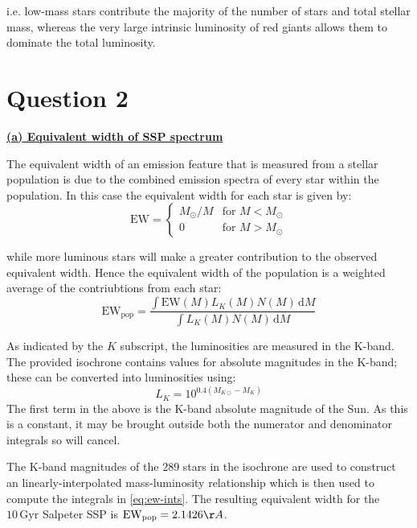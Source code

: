 \documentclass{article}
\begin{document}
i.e. low-mass stars contribute the majority of the number of stars and total stellar mass, whereas the very large intrinsic luminosity of red giants allows them to dominate the total luminosity.

\section*{Question 2}

\underline{\bf{(a)} Equivalent width of SSP spectrum}

The equivalent width of an emission feature that is measured from a stellar population is due to the combined emission spectra of every star within the population. In this case the equivalent width for each star is given by:
\begin{equation}
  \mathrm{EW}=
  \begin{cases}
    M_\odot/M & \mbox{for } M<M_\odot\\
           0 & \mbox{for } M>M_\odot
  \end{cases}
\end{equation}

while more luminous stars will make a greater contribution to the observed equivalent width. Hence the equivalent width of the population is a weighted average of the contriubtions from each star:
\begin{equation}
  \mathrm{EW}_{\mathrm{pop}}=\frac{\displaystyle\int\mathrm{EW}(M)L_K(M)N(M)\,\mathrm{d}M}{\displaystyle\int L_K(M)N(M)\,\mathrm{d}M}
  \label{eq:ew-ints}
\end{equation}  

As indicated by the $K$ subscript, the luminosities are measured in the K-band. The provided isochrone contains values for absolute magnitudes in the K-band; these can be converted into luminosities using:
\begin{equation}
  L_K=10^{0.4\left(M_{K\odot}-M_K\right)}
\end{equation}
The first term in the above is the K-band absolute magnitude of the Sun. As this is a constant, it may be brought outside both the numerator and denominator integrals so will cancel.

The K-band magnitudes of the 289 stars in the isochrone are used to construct an linearly-interpolated mass-luminosity relationship which is then used to compute the integrals in \eqref{eq:ew-ints}. The resulting equivalent width for the $10\,\mathrm{Gyr}$ Salpeter SSP is $\mathrm{EW}_{\mathrm{pop}}=2.1426\AA$.
\end{document}

